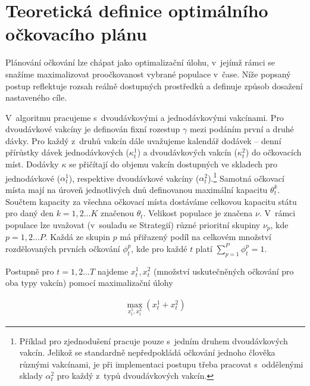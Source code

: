 \section*{Teoretická definice optimálního očkovacího plánu} 
\label{sec_vypocet}

Plánování očkování lze chápat jako optimalizační úlohu, v~jejímž rámci se snažíme maximalizovat proočkovanost vybrané populace v~čase. Níže popsaný postup reflektuje rozsah reálně dostupných prostředků a definuje způsob dosažení nastaveného cíle.


V~algoritmu pracujeme s~dvoudávkovými a jednodávkovými vakcínami. Pro dvoudávkové vakcíny je definován fixní rozestup $\gamma$ mezi podáním první a druhé dávky. Pro každý z~druhů vakcín dále uvažujeme kalendář dodávek -- denní přírůstky dávek jednodávkových ($\kappa_{t}^{1}$) a dvoudávkových vakcín ($\kappa_{t}^{2}$) do očkovacích míst. Dodávky $\kappa$ se přičítají do objemu vakcín dostupných ve skladech pro jednodávkové ($\alpha_{t}^{1}$), respektive dvoudávkové vakcíny ($\alpha_{t}^{2}$).\footnote{Příklad pro zjednodušení pracuje pouze s~jedním druhem dvoudávkových vakcín. Jelikož se standardně nepředpokládá očkování jednoho člověka různými vakcínami, je při implementaci postupu třeba pracovat s~oddělenými sklady $\alpha_{t}^{2}$ pro každý z~typů dvoudávkových vakcín.} 
Samotná očkovací místa mají na úroveň jednotlivých dnů definovanou maximální kapacitu $\theta_{t}^{k}$. Součtem kapacity za všechna očkovací místa dostáváme celkovou kapacitu státu pro daný den $k=1,2 \dots K$ značenou $\theta_{t}$.
%
Velikost populace je značena $\nu$. V~rámci populace lze uvažovat (v~souladu se Strategií) různé prioritní skupiny $\nu_{p}$, kde $p=1,2\dots P$. Každá ze skupin $p$ má přiřazený podíl na celkovém množství rozdělovaných prvních očkování $\phi_{t}^{p}$, kde pro každé $t$ platí $\sum_{p=1}^{P}\phi_{t}^{p}=1$. 

%
Postupně pro $t=1,2 \dots T$ najdeme $x_{t}^{1},x_{t}^{2}$ (množství uskutečněných očkování pro oba typy vakcín) pomocí maximalizační úlohy

\begin{equation}
\begin{aligned}
\max_{x_{t}^{1},x_{t}^{2}}(x_{t}^{1}+x_{t}^{2})
\end{aligned}
\end{equation}

